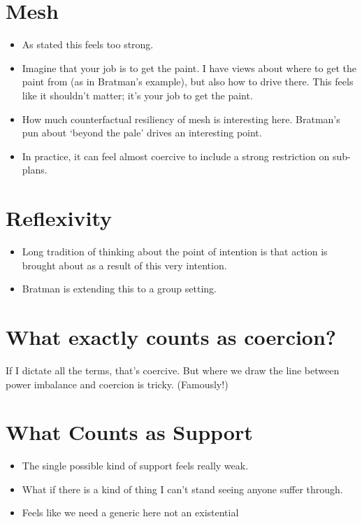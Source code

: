 \documentclass[11pt,]{article}
\providecommand{\tightlist}{%
  \setlength{\itemsep}{0pt}\setlength{\parskip}{0pt}}
\begin{document}
\hypertarget{mesh}{%
\section{Mesh}\label{mesh}}

\begin{itemize}
\tightlist
\item
  As stated this feels too strong.
\item
  Imagine that your job is to get the paint. I have views about where to
  get the paint from (as in Bratman's example), but also how to drive
  there. This feels like it shouldn't matter; it's your job to get the
  paint.
\item
  How much counterfactual resiliency of mesh is interesting here.
  Bratman's pun about `beyond the pale' drives an interesting point.
\item
  In practice, it can feel almost coercive to include a strong
  restriction on sub-plans.
\end{itemize}

\hypertarget{reflexivity}{%
\section{Reflexivity}\label{reflexivity}}

\begin{itemize}
\tightlist
\item
  Long tradition of thinking about the point of intention is that action
  is brought about as a result of this very intention.
\item
  Bratman is extending this to a group setting.
\end{itemize}

\hypertarget{what-exactly-counts-as-coercion}{%
\section{What exactly counts as
coercion?}\label{what-exactly-counts-as-coercion}}

If I dictate all the terms, that's coercive. But where we draw the line
between power imbalance and coercion is tricky. (Famously!)

\hypertarget{what-counts-as-support}{%
\section{What Counts as Support}\label{what-counts-as-support}}

\begin{itemize}
\tightlist
\item
  The single possible kind of support feels really weak.
\item
  What if there is a kind of thing I can't stand seeing anyone suffer
  through.
\item
  Feels like we need a generic here not an existential
\end{itemize}
\end{document}
